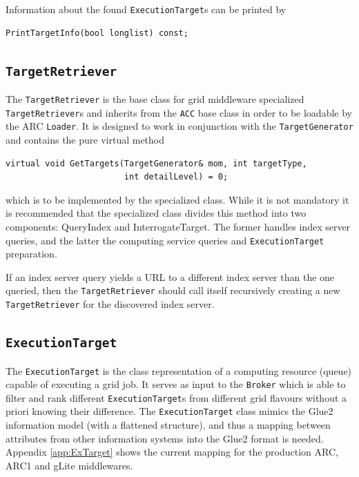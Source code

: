 \documentclass{book}
\newcommand{\ACC}{\texttt{ACC}}
\newcommand{\Broker}{\texttt{Broker}}
\newcommand{\ExecutionTarget}{\texttt{ExecutionTarget}}
\newcommand{\TargetGenerator}{\texttt{TargetGenerator}}
\newcommand{\TargetRetriever}{\texttt{TargetRetriever}}
\begin{document}
Information about the found {\ExecutionTarget}s can be printed by 

\begin{shaded}
\begin{verbatim}
PrintTargetInfo(bool longlist) const;
\end{verbatim}
\end{shaded}

\subsection{{\TargetRetriever}}

The {\TargetRetriever} is the base class for grid middleware specialized 
{\TargetRetriever}s and inherits from the {\ACC} base class in
order to be loadable by the ARC \texttt{Loader}. It is designed to
work in conjunction with the {\TargetGenerator} and contains the pure
virtual method

\begin{shaded}
\begin{verbatim}
virtual void GetTargets(TargetGenerator& mom, int targetType,
                        int detailLevel) = 0;
\end{verbatim}
\end{shaded}

which is to be implemented by the specialized class. While it is not
mandatory it is recommended that the specialized class divides this
method into two components: QueryIndex and InterrogateTarget. The
former handles index server queries, and the latter the computing
service queries and {\ExecutionTarget} preparation.

If an index server query yields a URL to a different index server
than the one queried, then the {\TargetRetriever} should call itself
recursively creating a new {\TargetRetriever} for the discovered index
server.

\subsection{{\ExecutionTarget}}

The {\ExecutionTarget} is the class representation of a computing
resource (queue) capable of executing a grid job. It serves as input
to the {\Broker} which is able to filter and rank different 
{\ExecutionTarget}s from different grid flavours without a
priori knowing their difference. The {\ExecutionTarget} class mimics
the Glue2 information model (with a flattened structure), and thus a
mapping between attributes from other information systems into the
Glue2 format is needed. Appendix \ref{app:ExTarget} shows the current
mapping for the production ARC, ARC1 and gLite middlewares.
\end{document}
